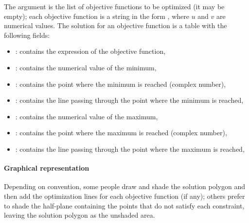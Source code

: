 The  argument is the list of objective functions to be optimized (it may be empty); each objective function is a string in the form , where $u$ and $v$ are numerical values. The solution for an objective function is a table with the following fields:
\begin{itemize}
    \item {}: contains the expression of the objective function,
    \item {}: contains the numerical value of the minimum,
    \item {}: contains the point where the minimum is reached (complex number),
    \item {}: contains the line passing through the point where the minimum is reached,
    \item {}: contains the numerical value of the maximum,
    \item {}: contains the point where the maximum is reached (complex number),
    \item {}: contains the line passing through the point where the maximum is reached,
\end{itemize}

\paragraph{Graphical representation}

Depending on convention, some people draw and shade the solution polygon and then add the optimization lines for each objective function (if any); others prefer to shade the half-plane containing the points that do not satisfy each constraint, leaving the solution polygon as the unshaded area.

